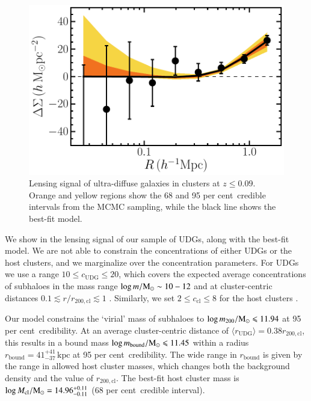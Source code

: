 \documentclass[usenatbib,fleqn]{mnras}
\def\udg{\mathrm{UDG}}
\def\bound{\mathrm{bound}}
\def\Mcl{M_\mathrm{cl}}
\def\percent{ per cent}
\begin{document}
\begin{figure}
 \centerline{\includegraphics[width=0.95\linewidth]{esd.pdf}}
\caption{Lensing signal of ultra-diffuse galaxies in clusters at $z\leq0.09$. Orange and yellow regions show the 68 and 95\percent\ credible intervals from the MCMC sampling, while the black line shows the best-fit model.}
\label{f:esd}
\end{figure}


We show in  the lensing signal of our sample of UDGs, along with the best-fit model. We are not able to constrain the concentrations of either UDGs or the host clusters, and we marginalize over the concentration parameters. For UDGs we use a range $10 \leq c_\udg \leq 20$, which covers the expected average concentrations of subhaloes in the mass range $\log m/\mathrm{M}_\odot \sim 10-12$ and at cluster-centric distances $0.1\lesssim r/r_\mathrm{200,cl} \lesssim 1$ \citep{moline16}. Similarly, we set $2 \leq c_\mathrm{cl} \leq 8$ for the host clusters \citep[e.g.,][]{dutton14}.

Our model constrains the `virial' mass of subhaloes to $\log m_{200}/\mathrm{M}_\odot\leqslant11.94$ at 95\percent\ credibility. At an average cluster-centric distance of $\langle r_\udg \rangle=0.38r_\mathrm{200,cl}$, this results in a bound mass $\log m_\bound/\Msun\leq 11.45$ within a radius $r_\bound=41_{-37}^{+41}\,\mathrm{kpc}$ at 95\percent\ credibility. The wide range in $r_\bound$ is given by the range in allowed host cluster masses, which changes both the background density and the value of $r_\mathrm{200,cl}$. The best-fit host cluster mass is $\log\Mcl/\Msun=14.96_{-0.11}^{+0.11}$ (68\percent\ credible interval).
\end{document}
